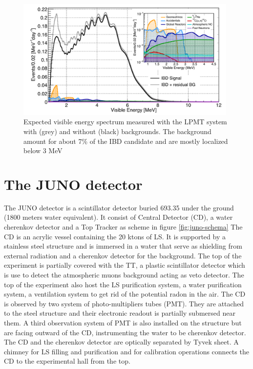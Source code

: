 \begin{figure}[ht]
  \centering
  \includegraphics[height=6cm]{images/juno/spectrum_with_background.png}
  \caption{Expected visible energy spectrum measured with the LPMT system with (grey) and without (black) backgrounds. The background amount for about 7\% of the IBD candidate and are mostly localized below 3 MeV \cite{juno_collaboration_sub-percent_2022}}
  \label{fig:spectrum_with_background}
\end{figure}


\section{The JUNO detector}

The JUNO detector is a scintillator detector buried 693.35 under the ground (1800 meters water equivalent). It consist of Central Detector (CD), a water cherenkov detector and a Top Tracker as scheme in figure \ref{fig:juno-schema}
The CD is an acrylic vessel containing the 20 ktons of LS. It is supported by a stainless steel structure and is immersed in a water that serve as shielding from external radiation and a cherenkov detector for the background. The top of the experiment is partially covered with the TT, a plastic scintillator detector which is use to detect the atmospheric muons background acting as veto detector.
The top of the experiment also host the LS purification system, a water purification system, a ventilation system to get rid of the potential radon in the air.
The CD is observed by two system of photo-multipliers tubes (PMT). They are attached to the steel structure and their electronic readout is partially submersed near them. A third observation system of PMT is also installed on the structure but are facing outward of the CD, instrumenting the water to be cherenkov detector. The CD and the cherenkov detector are optically separated by Tyvek sheet. A chimney for LS filling and purification and for calibration operations connects the CD to the experimental hall from the top.

